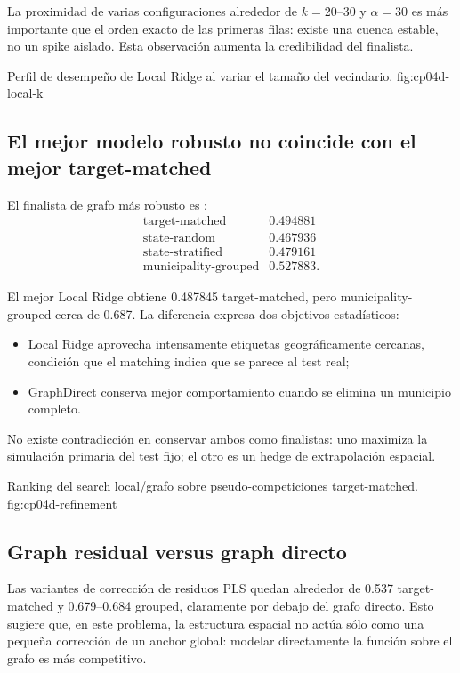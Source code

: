 La proximidad de varias configuraciones alrededor de $k=20$--30 y $\alpha=30$ es más
importante que el orden exacto de las primeras filas: existe una cuenca estable, no un spike
aislado. Esta observación aumenta la credibilidad del finalista.

{Perfil de desempeño de Local Ridge al variar el tamaño del vecindario.}
{fig:cp04d-local-k}

\subsection{El mejor modelo robusto no coincide con el mejor target-matched}

El finalista de grafo más robusto es
:
\[
\begin{array}{lr}
\text{target-matched} & 0.494881\\
\text{state-random} & 0.467936\\
\text{state-stratified} & 0.479161\\
\text{municipality-grouped} & 0.527883.
\end{array}
\]

El mejor Local Ridge obtiene 0.487845 target-matched, pero municipality-grouped cerca de
0.687. La diferencia expresa dos objetivos estadísticos:
\begin{itemize}
\item Local Ridge aprovecha intensamente etiquetas geográficamente cercanas, condición que
el matching indica que se parece al test real;
\item GraphDirect conserva mejor comportamiento cuando se elimina un municipio completo.
\end{itemize}

No existe contradicción en conservar ambos como finalistas: uno maximiza la simulación primaria
del test fijo; el otro es un hedge de extrapolación espacial.

{Ranking del search local/grafo sobre pseudo-competiciones target-matched.}
{fig:cp04d-refinement}

\subsection{Graph residual versus graph directo}

Las variantes de corrección de residuos PLS quedan alrededor de 0.537 target-matched y
0.679--0.684 grouped, claramente por debajo del grafo directo. Esto sugiere que, en este
problema, la estructura espacial no actúa sólo como una pequeña corrección de un anchor global:
modelar directamente la función sobre el grafo es más competitivo.

